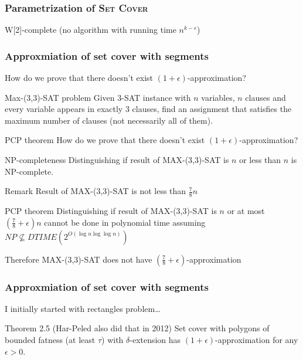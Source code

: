 \documentclass{beamer}
\begin{document}
\begin{frame}
\frametitle{Parametrization of \textsc{Set Cover}}
W[2]-complete (no algorithm with running time $n^{k-\epsilon}$)
\end{frame}

\begin{frame}
\frametitle{Approxmiation of set cover with segments}
How do we prove that there doesn't exist $(1+\epsilon)$-approximation?

\begin{block}{Max-(3,3)-SAT problem}
Given 3-SAT instance with $n$ variables, $n$ clauses
and every variable appears in exactly 3 clauses,
find an assignment
that satisfies the maximum number of clauses
(not necessarily all of them).
\end{block}

\end{frame}


\begin{frame}{PCP theorem}
How do we prove that there doesn't exist $(1+\epsilon)$-approximation?
\begin{block}{NP-completeness}
Distinguishing if result of MAX-(3,3)-SAT is
$n$ or less than $n$ is NP-complete.
\end{block}

\begin{block}{Remark}
Result of MAX-(3,3)-SAT is not less than $\frac{7}{8}n$
\end{block}

\begin{block}{PCP theorem}
Distinguishing if result of MAX-(3,3)-SAT is $n$
or at most $(\frac{7}{8} + \epsilon)n$
cannot be done in polynomial time assuming $NP \nsubseteq DTIME(2^{O(\log n \log \log n)})$
\end{block}

Therefore MAX-(3,3)-SAT does not have
$(\frac{7}{8}+\epsilon)$-approximation


\end{frame}

\begin{frame}
\frametitle{Approxmiation of set cover with segments}
I initially started with rectangles problem\ldots

\begin{block}{Theorem 2.5 (Har-Peled also did that in 2012)}
	Set cover with polygons of bounded fatness (at least $\tau$)
	 with $\delta$-extension has $(1+\epsilon)$-approximation
	 for any $\epsilon > 0$.
	
\end{block}



\end{frame}
\end{document}
